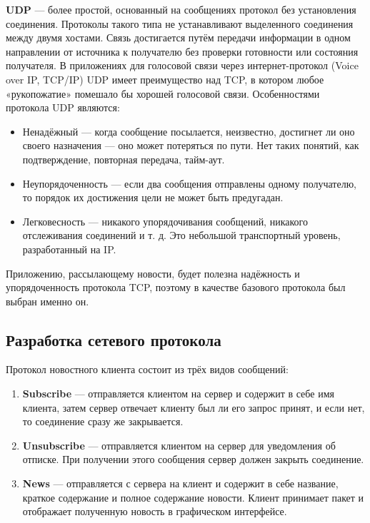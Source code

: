\textbf{UDP} — более простой, основанный на сообщениях протокол без установления соединения.
Протоколы такого типа не устанавливают выделенного соединения между двумя хостами. Связь достигается
путём передачи информации в одном направлении от источника к получателю без проверки готовности или
состояния получателя. В приложениях для голосовой связи через интернет-протокол (Voice over IP, TCP/IP)
UDP имеет преимущество над TCP, в котором любое «рукопожатие» помешало бы хорошей голосовой связи.
Особенностями протокола UDP являются:

\begin{itemize}
	\item Ненадёжный — когда сообщение посылается, неизвестно, достигнет ли оно своего
	назначения — оно может потеряться по пути. Нет таких понятий, как подтверждение,
	повторная передача, тайм-аут.

    \item Неупорядоченность — если два сообщения отправлены одному получателю, то порядок
	их достижения цели не может быть предугадан.

    \item Легковесность — никакого упорядочивания сообщений, никакого отслеживания
	соединений и т. д. Это небольшой транспортный уровень, разработанный на IP.
\end{itemize}

Приложению, рассылающему новости, будет полезна надёжность и упорядоченность протокола TCP, поэтому
в качестве базового протокола был выбран именно он.

\subsection{Разработка сетевого протокола}

Протокол новостного клиента состоит из трёх видов сообщений:

\begin{enumerate}
	\item \textbf{Subscribe} — отправляется клиентом на сервер и содержит в себе имя клиента, затем сервер
	отвечает клиенту был ли его запрос принят, и если нет, то соединение сразу же закрывается.

	\item \textbf{Unsubscribe} — отправляется клиентом на сервер для уведомления об отписке. При получении
	этого сообщения сервер должен закрыть соединение.

	\item \textbf{News} — отправляется с сервера на клиент и содержит в себе название, краткое содержание и
	полное содержание новости. Клиент принимает пакет и отображает полученную новость в графическом
	интерфейсе.
\end{enumerate}

